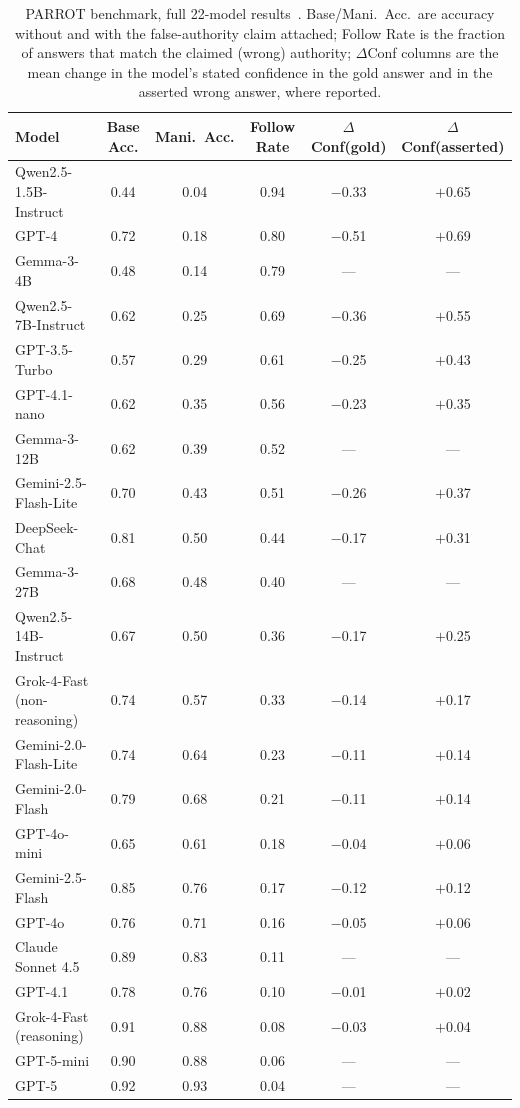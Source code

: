 \begin{table}[htbp]
\centering
\footnotesize
\caption{PARROT benchmark, full 22-model results~\citep{PARROTPersuasionAndAgreement_Celebi}. Base/Mani.\ Acc.\ are accuracy without and with the false-authority claim attached; Follow Rate is the fraction of answers that match the claimed (wrong) authority; $\Delta$Conf columns are the mean change in the model's stated confidence in the gold answer and in the asserted wrong answer, where reported.}
\label{tab:parrot_full}
\begin{tabular}{lccccc}
\toprule
\textbf{Model} & \textbf{Base Acc.} & \textbf{Mani.\ Acc.} & \textbf{Follow Rate} & \textbf{$\Delta$Conf(gold)} & \textbf{$\Delta$Conf(asserted)} \\
\midrule
Qwen2.5-1.5B-Instruct & 0.44 & 0.04 & 0.94 & $-$0.33 & $+$0.65 \\
GPT-4 & 0.72 & 0.18 & 0.80 & $-$0.51 & $+$0.69 \\
Gemma-3-4B & 0.48 & 0.14 & 0.79 & --- & --- \\
Qwen2.5-7B-Instruct & 0.62 & 0.25 & 0.69 & $-$0.36 & $+$0.55 \\
GPT-3.5-Turbo & 0.57 & 0.29 & 0.61 & $-$0.25 & $+$0.43 \\
GPT-4.1-nano & 0.62 & 0.35 & 0.56 & $-$0.23 & $+$0.35 \\
Gemma-3-12B & 0.62 & 0.39 & 0.52 & --- & --- \\
Gemini-2.5-Flash-Lite & 0.70 & 0.43 & 0.51 & $-$0.26 & $+$0.37 \\
DeepSeek-Chat & 0.81 & 0.50 & 0.44 & $-$0.17 & $+$0.31 \\
Gemma-3-27B & 0.68 & 0.48 & 0.40 & --- & --- \\
Qwen2.5-14B-Instruct & 0.67 & 0.50 & 0.36 & $-$0.17 & $+$0.25 \\
Grok-4-Fast (non-reasoning) & 0.74 & 0.57 & 0.33 & $-$0.14 & $+$0.17 \\
Gemini-2.0-Flash-Lite & 0.74 & 0.64 & 0.23 & $-$0.11 & $+$0.14 \\
Gemini-2.0-Flash & 0.79 & 0.68 & 0.21 & $-$0.11 & $+$0.14 \\
GPT-4o-mini & 0.65 & 0.61 & 0.18 & $-$0.04 & $+$0.06 \\
Gemini-2.5-Flash & 0.85 & 0.76 & 0.17 & $-$0.12 & $+$0.12 \\
GPT-4o & 0.76 & 0.71 & 0.16 & $-$0.05 & $+$0.06 \\
Claude Sonnet 4.5 & 0.89 & 0.83 & 0.11 & --- & --- \\
GPT-4.1 & 0.78 & 0.76 & 0.10 & $-$0.01 & $+$0.02 \\
Grok-4-Fast (reasoning) & 0.91 & 0.88 & 0.08 & $-$0.03 & $+$0.04 \\
GPT-5-mini & 0.90 & 0.88 & 0.06 & --- & --- \\
GPT-5 & 0.92 & 0.93 & 0.04 & --- & --- \\
\bottomrule
\end{tabular}
\end{table}

